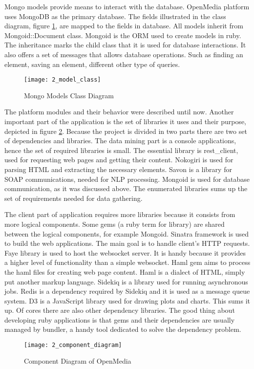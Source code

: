 Mongo models provide means to interact with the database. OpenMedia platform uses MongoDB as the primary database. The fields illustrated in the class diagram, figure \ref{model_class}, are mapped to the fields in database. All models inherit from Mongoid::Document class. Mongoid is the ORM used to create models in ruby. The inheritance marks the child class that it is used for database interactions. It also offers a set of messages that allows database operations. Such as finding an element, saving an element, different other type of queries.

\begin{figure}[!ht]
\centering
\texttt{[image: 2\_model\_class]}
\caption{Mongo Models Class Diagram}\label{model_class}
\end{figure}

The platform modules and their behavior were described until now. Another important part of the application is the set of libraries it uses and their purpose, depicted in figure \ref{component_diagram}. Because the project is divided in two parts there are two set of dependencies and libraries. The data mining part is a console applications, hence the set of required libraries is small. The essential library is rest\_client, used for requesting web pages and getting their content. Nokogiri is used for parsing HTML and extracting the necessary elements. Savon is a library for SOAP communications, needed for NLP processing. Mongoid is used for database communication, as it was discussed above. The enumerated libraries sums up the set of requirements needed for data gathering.

The client part of application requires more libraries because it consists from more logical components. Some gems (a ruby term for library) are shared between the logical components, for example Mongoid. Sinatra framework is used to build the web applications. The main goal is to handle client's HTTP requests. Faye library is used to host the websocket server. It is handy because it provides a higher level of functionality than a simple websocket. Haml gem aims to process the haml files for creating web page content. Haml is a dialect of HTML, simply put another markup language. Sidekiq is a library used for running asynchronous jobs. Redis is a dependency required by Sidekiq and it is used as a message queue system. D3 is a JavaScript library used for drawing plots and charts. This sums it up. Of cores there are also other dependency libraries. The good thing about developing ruby applications is that gems and their dependencies are usually managed by bundler, a handy tool dedicated to solve the dependency problem.
\begin{figure}[!ht]
\centering
\texttt{[image: 2\_component\_diagram]}
\caption{Component Diagram of OpenMedia}\label{component_diagram}
\end{figure}

